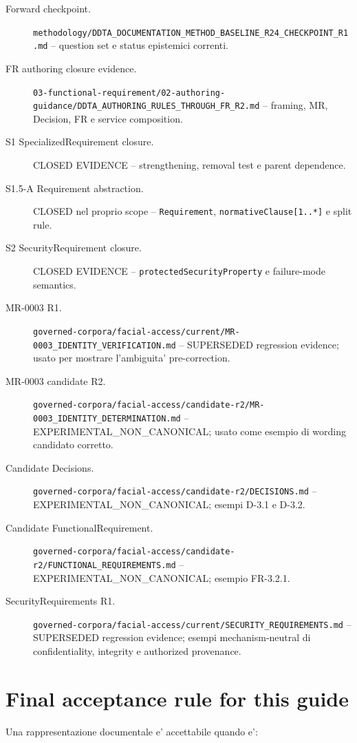 \documentclass[11pt,a4paper]{article}
\newcommand{\code}[1]{\texttt{#1}}
\begin{document}
\begin{description}
\item[Forward checkpoint.] \nolinkurl{methodology/DDTA_DOCUMENTATION_METHOD_BASELINE_R24_CHECKPOINT_R1.md} -- question set e status epistemici correnti.
\item[FR authoring closure evidence.] \nolinkurl{03-functional-requirement/02-authoring-guidance/DDTA_AUTHORING_RULES_THROUGH_FR_R2.md} -- framing, MR, Decision, FR e service composition.
\item[S1 SpecializedRequirement closure.] CLOSED EVIDENCE -- strengthening, removal test e parent dependence.
\item[S1.5-A Requirement abstraction.] CLOSED nel proprio scope -- \code{Requirement}, \code{normativeClause[1..*]} e split rule.
\item[S2 SecurityRequirement closure.] CLOSED EVIDENCE -- \code{protectedSecurityProperty} e failure-mode semantics.
\item[MR-0003 R1.] \nolinkurl{governed-corpora/facial-access/current/MR-0003_IDENTITY_VERIFICATION.md} -- SUPERSEDED regression evidence; usato per mostrare l'ambiguita' pre-correction.
\item[MR-0003 candidate R2.] \nolinkurl{governed-corpora/facial-access/candidate-r2/MR-0003_IDENTITY_DETERMINATION.md} -- EXPERIMENTAL\_NON\_CANONICAL; usato come esempio di wording candidato corretto.
\item[Candidate Decisions.] \nolinkurl{governed-corpora/facial-access/candidate-r2/DECISIONS.md} -- EXPERIMENTAL\_NON\_CANONICAL; esempi D-3.1 e D-3.2.
\item[Candidate FunctionalRequirement.] \nolinkurl{governed-corpora/facial-access/candidate-r2/FUNCTIONAL_REQUIREMENTS.md} -- EXPERIMENTAL\_NON\_CANONICAL; esempio FR-3.2.1.
\item[SecurityRequirements R1.] \nolinkurl{governed-corpora/facial-access/current/SECURITY_REQUIREMENTS.md} -- SUPERSEDED regression evidence; esempi mechanism-neutral di confidentiality, integrity e authorized provenance.
\end{description}

\section{Final acceptance rule for this guide}

Una rappresentazione documentale e' accettabile quando e':
\end{document}
